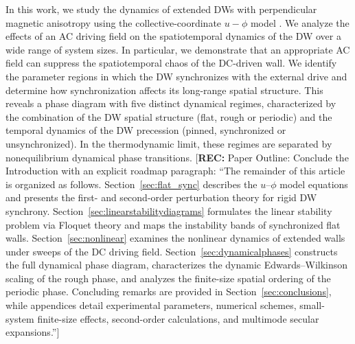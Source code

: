 \documentclass[prb,aps,twocolumn,superscriptaddress,floatfix]{revtex4-1}
\newcommand{\rec}[1]{{\color{magenta}[\textbf{REC:} #1]}}
\begin{document}
In this work, we study the dynamics of extended DWs with perpendicular magnetic anisotropy using the collective-coordinate $u-\phi$ model \cite{Slonczewski1972, Schryer1974}. We analyze the effects of an AC driving field on the spatiotemporal dynamics of the DW over a wide range of system sizes. In particular, we demonstrate that an appropriate AC field can suppress the spatiotemporal chaos of the DC-driven wall. We identify the parameter regions in which the DW synchronizes with the external drive and determine how synchronization affects its long-range spatial structure. This reveals a phase diagram with five distinct dynamical regimes, characterized by the combination of the DW spatial structure (flat, rough or periodic) and the temporal dynamics of the DW precession (pinned, synchronized or unsynchronized). In the thermodynamic limit, these regimes are separated by nonequilibrium dynamical phase transitions.
\rec{Paper Outline: Conclude the Introduction with an explicit roadmap paragraph: ``The remainder of this article is organized as follows. Section~\ref{sec:flat_sync} describes the $u$--$\phi$ model equations and presents the first- and second-order perturbation theory for rigid DW synchrony. Section~\ref{sec:linearstabilitydiagrams} formulates the linear stability problem via Floquet theory and maps the instability bands of synchronized flat walls. Section~\ref{sec:nonlinear} examines the nonlinear dynamics of extended walls under sweeps of the DC driving field. Section~\ref{sec:dynamicalphases} constructs the full dynamical phase diagram, characterizes the dynamic Edwards--Wilkinson scaling of the rough phase, and analyzes the finite-size spatial ordering of the periodic phase. Concluding remarks are provided in Section~\ref{sec:conclusions}, while appendices detail experimental parameters, numerical schemes, small-system finite-size effects, second-order calculations, and multimode secular expansions.''}
\end{document}
